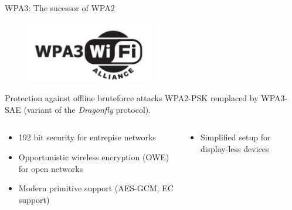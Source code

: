 \documentclass[xcolor=table]{bredelebeamer}
\newif\ifplacelogo %
\begin{document}
\placelogofalse
\begin{frame}{WPA3: The sucessor of WPA2}
\begin{figure}[H]
    \centering
    \includegraphics[width=0.5\textwidth]{images/wpa3.png}
    \label{fig:my_label}
\end{figure}
    \begin{exampleblock}{Protection against offline bruteforce attacks}
WPA2-PSK remplaced by WPA3-SAE (variant of the \textit{Dragonfly} protocol).
\end{exampleblock}
\begin{columns}
\begin{column}{0.6\textwidth}  %

\begin{itemize}
    \item 192 bit security for entrepise networks
    \item Opportunistic wireless encryption (OWE) for open networks
    \item Modern primitive support (AES-GCM, EC support)
\end{itemize}
\end{column}
\begin{column}{0.4\textwidth}
    \begin{itemize}
        \item Simplified setup for display-less devices

    \end{itemize}
\end{column}
\end{columns}


\end{frame}
\placelogofalse
\end{document}
